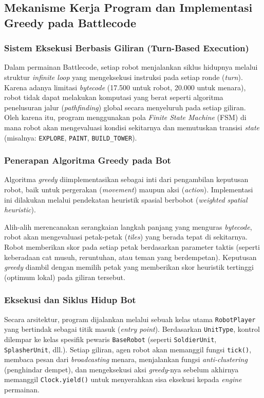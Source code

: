 \subsection{Mekanisme Kerja Program dan Implementasi Greedy pada Battlecode}
\subsubsection{Sistem Eksekusi Berbasis Giliran (Turn-Based Execution)}
Dalam permainan Battlecode, setiap robot menjalankan siklus hidupnya melalui struktur \textit{infinite loop} yang mengeksekusi instruksi pada setiap ronde (\textit{turn}). Karena adanya limitasi \textit{bytecode} (17.500 untuk robot, 20.000 untuk menara), robot tidak dapat melakukan komputasi yang berat seperti algoritma penelusuran jalur (\textit{pathfinding}) global secara menyeluruh pada setiap giliran. Oleh karena itu, program menggunakan pola \textit{Finite State Machine} (FSM) di mana robot akan mengevaluasi kondisi sekitarnya dan memutuskan transisi \textit{state} (misalnya: \texttt{EXPLORE}, \texttt{PAINT}, \texttt{BUILD\_TOWER}).

\subsubsection{Penerapan Algoritma Greedy pada Bot}
Algoritma \textit{greedy} diimplementasikan sebagai inti dari pengambilan keputusan robot, baik untuk pergerakan (\textit{movement}) maupun aksi (\textit{action}). Implementasi ini dilakukan melalui pendekatan heuristik spasial berbobot (\textit{weighted spatial heuristic}). 

Alih-alih merencanakan serangkaian langkah panjang yang menguras \textit{bytecode}, robot akan mengevaluasi petak-petak (\textit{tiles}) yang berada tepat di sekitarnya. Robot memberikan skor pada setiap petak berdasarkan parameter taktis (seperti keberadaan cat musuh, reruntuhan, atau teman yang berdempetan). Keputusan \textit{greedy} diambil dengan memilih petak yang memberikan skor heuristik tertinggi (optimum lokal) pada giliran tersebut.

\subsubsection{Eksekusi dan Siklus Hidup Bot}
Secara arsitektur, program dijalankan melalui sebuah kelas utama \texttt{RobotPlayer} yang bertindak sebagai titik masuk (\textit{entry point}). Berdasarkan \texttt{UnitType}, kontrol dilempar ke kelas spesifik pewaris \texttt{BaseRobot} (seperti \texttt{SoldierUnit}, \texttt{SplasherUnit}, dll.). Setiap giliran, agen robot akan memanggil fungsi \texttt{tick()}, membaca pesan dari \textit{broadcasting} menara, menjalankan fungsi \textit{anti-clustering} (penghindar dempet), dan mengeksekusi aksi \textit{greedy}-nya sebelum akhirnya memanggil \texttt{Clock.yield()} untuk menyerahkan sisa eksekusi kepada \textit{engine} permainan.